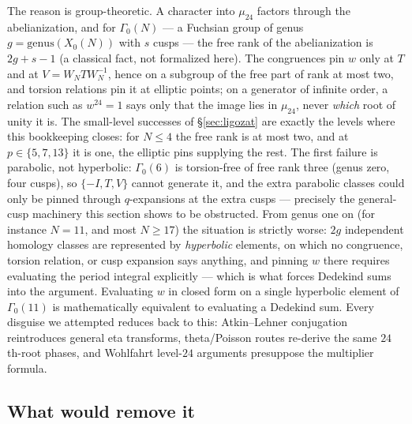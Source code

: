 \documentclass[11pt, a4paper]{article}
\theoremstyle{remark}
\begin{document}
The reason is group-theoretic. A character into $\mu_{24}$ factors through the abelianization,
and for $\Gamma_0(N)$ --- a Fuchsian group of genus $g = \mathrm{genus}(X_0(N))$ with $s$ cusps ---
the free rank of the abelianization is $2g + s - 1$ (a classical fact, not formalized here). The
congruences pin $w$ only at $T$ and at $V = W_N T W_N^{-1}$, hence on a subgroup of the free part
of rank at most two, and torsion relations pin it at elliptic points; on a generator of infinite
order, a relation such as $w^{24}=1$ says only that the image lies in $\mu_{24}$, never \emph{which}
root of unity it is. The small-level successes of \S\ref{sec:ligozat} are exactly the levels where
this bookkeeping closes: for $N\le 4$ the free rank is at most two, and at $p\in\{5,7,13\}$ it is
one, the elliptic pins supplying the rest. The first failure is parabolic, not hyperbolic:
$\Gamma_0(6)$ is torsion-free of free rank three (genus zero, four cusps), so $\{-I,T,V\}$ cannot
generate it, and the extra parabolic classes could only be pinned through $q$-expansions at the
extra cusps --- precisely the general-cusp machinery this section shows to be obstructed. From
genus one on (for instance $N=11$, and most $N\ge 17$) the situation is strictly worse: $2g$
independent homology classes are represented by \emph{hyperbolic} elements, on which no congruence,
torsion relation, or cusp expansion says anything, and pinning $w$ there requires evaluating the
period integral explicitly --- which is what forces Dedekind sums into the argument. Evaluating $w$
in closed form on a single hyperbolic element of $\Gamma_0(11)$ is mathematically equivalent to
evaluating a Dedekind sum. Every disguise
we attempted reduces back to this: Atkin--Lehner conjugation reintroduces general eta transforms,
theta/Poisson routes re-derive the same $24$th-root phases, and Wohlfahrt level-$24$ arguments
presuppose the multiplier formula.

\subsection*{What would remove it}
\end{document}
